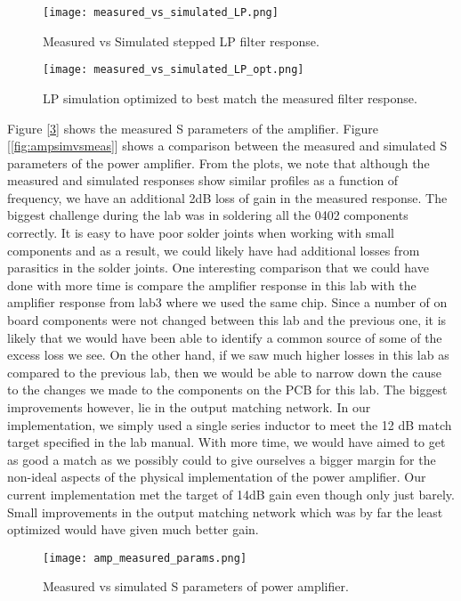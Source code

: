 \documentclass{article}
\begin{document}
\begin{figure}[!htbp]
    \centering
    \texttt{[image: measured\_vs\_simulated\_LP.png]}
    \caption{Measured vs Simulated stepped LP filter response.}
    \label{fig:LPsimvsmeas}
\end{figure}


\begin{figure}[!htbp]
    \centering
    \texttt{[image: measured\_vs\_simulated\_LP\_opt.png]}
    \caption{LP simulation optimized to best match the measured filter response.}
    \label{fig:LPoptsimvsmeas}
\end{figure}

Figure [\ref{fig:ampmeasparams}] shows the measured S parameters of the amplifier. Figure [\ref{fig:ampsimvsmeas}] shows a comparison between the measured and simulated S parameters of the power amplifier. From the plots, we note that although the measured and simulated responses show similar profiles as a function of frequency, we have an additional 2dB loss of gain in the measured response. The biggest challenge during the lab was in soldering all the 0402 components correctly. It is easy to have poor solder joints when working with small components and as a result, we could likely have had additional losses from parasitics in the solder joints. One interesting comparison that we could have done with more time is compare the amplifier response in this lab with the amplifier response from lab3 where we used the same chip. Since a number of on board components were not changed between this lab and the previous one, it is likely that we would have been able to identify a common source of some of the excess loss we see. On the other hand, if we saw much higher losses in this lab as compared to the previous lab, then we would be able to narrow down the cause to the changes we made to the components on the PCB for this lab. The biggest improvements however, lie in the output matching network. In our implementation, we simply used a single series inductor to meet the 12 dB match target specified in the lab manual. With more time, we would have aimed to get as good a match as we possibly could to give ourselves a bigger margin for the non-ideal aspects of the physical implementation of the power amplifier. Our current implementation met the target of 14dB gain even though only just barely. Small improvements in the output matching network which was by far the least optimized would have given much better gain. 

\begin{figure}[!htbp]
    \centering
    \texttt{[image: amp\_measured\_params.png]}
    \caption{Measured vs simulated S parameters of power amplifier.}
    \label{fig:ampmeasparams}
\end{figure}
\end{document}
